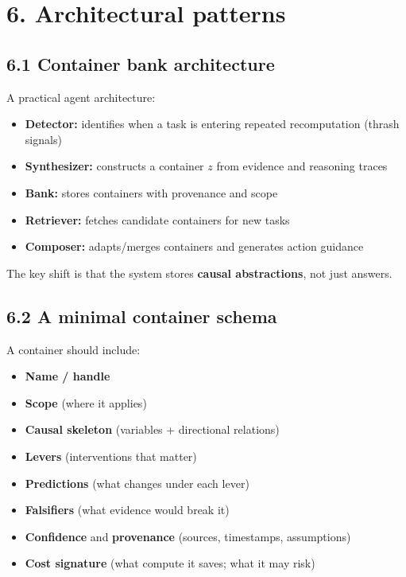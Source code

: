 \documentclass[11pt]{article}
\begin{document}
\section*{6. Architectural patterns}

\subsection*{6.1 Container bank architecture}
A practical agent architecture:

\begin{itemize}
\item \textbf{Detector:} identifies when a task is entering repeated recomputation (thrash signals)
\item \textbf{Synthesizer:} constructs a container \(z\) from evidence and reasoning traces
\item \textbf{Bank:} stores containers with provenance and scope
\item \textbf{Retriever:} fetches candidate containers for new tasks
\item \textbf{Composer:} adapts/merges containers and generates action guidance
\end{itemize}

The key shift is that the system stores \textbf{causal abstractions}, not just answers.

\subsection*{6.2 A minimal container schema}
A container should include:

\begin{itemize}
\item \textbf{Name / handle}
\item \textbf{Scope} (where it applies)
\item \textbf{Causal skeleton} (variables + directional relations)
\item \textbf{Levers} (interventions that matter)
\item \textbf{Predictions} (what changes under each lever)
\item \textbf{Falsifiers} (what evidence would break it)
\item \textbf{Confidence} and \textbf{provenance} (sources, timestamps, assumptions)
\item \textbf{Cost signature} (what compute it saves; what it may risk)
\end{itemize}
\end{document}
